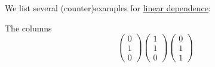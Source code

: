\begin{example}\label{ex:def:linear_dependence}
  We list several (counter)examples for \hyperref[def:linear_dependence]{linear dependence}:
  \begin{thmenum}
     The columns
    \begin{equation*}
      \begin{pmatrix}
        0 \\ 1 \\ 0
      \end{pmatrix}
      \begin{pmatrix}
        1 \\ 1 \\ 0
      \end{pmatrix}
      \begin{pmatrix}
        0 \\ 1 \\ 1
      \end{pmatrix}
    \end{equation*}
  \end{thmenum}
\end{example}


